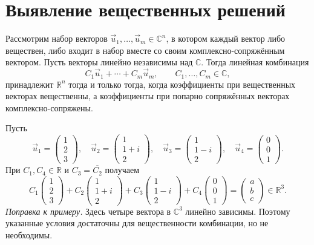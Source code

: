 \documentclass[12pt,a4paper]{article}
\numberwithin{equation}{section}
\newcommand{\R}{\mathbb{R}}
\newcommand{\vect}[1]{\vec{#1}}
\begin{document}
\section{Выявление вещественных решений}

\label{lem:real-linear-combination}
\begin{lemmaHSE}
Рассмотрим набор векторов \(\vect u_1,\ldots,\vect u_m\in\mathbb C^n\),
в котором каждый вектор либо веществен, либо входит в набор вместе со
своим комплексно-сопряжённым вектором. Пусть векторы линейно независимы
над \(\mathbb C\). Тогда линейная комбинация
\[
 C_1\vect u_1+\cdots+C_m\vect u_m,\qquad C_1,\ldots,C_m\in\mathbb C,
\]
принадлежит \(\R^n\) тогда и только тогда, когда коэффициенты при
вещественных векторах вещественны, а коэффициенты при попарно сопряжённых
векторах комплексно-сопряжены.
\end{lemmaHSE}

\begin{exampleHSE}
Пусть
\[
 \vect u_1=\begin{pmatrix}1\\2\\3\end{pmatrix},\quad
 \vect u_2=\begin{pmatrix}1\\1+i\\2\end{pmatrix},\quad
 \vect u_3=\begin{pmatrix}1\\1-i\\2\end{pmatrix},\quad
 \vect u_4=\begin{pmatrix}0\\0\\1\end{pmatrix}.
\]
При \(C_1,C_4\in\R\) и \(C_3=\overline{C_2}\) получаем
\[
 C_1\begin{pmatrix}1\\2\\3\end{pmatrix}
 +C_2\begin{pmatrix}1\\1+i\\2\end{pmatrix}
 +C_3\begin{pmatrix}1\\1-i\\2\end{pmatrix}
 +C_4\begin{pmatrix}0\\0\\1\end{pmatrix}
 =\begin{pmatrix}a\\b\\c\end{pmatrix}\in\R^3.
\]
\emph{Поправка к примеру.} Здесь четыре вектора в \(\mathbb C^3\)
линейно зависимы. Поэтому указанные условия достаточны для вещественности
комбинации, но не необходимы.
\end{exampleHSE}
\end{document}
